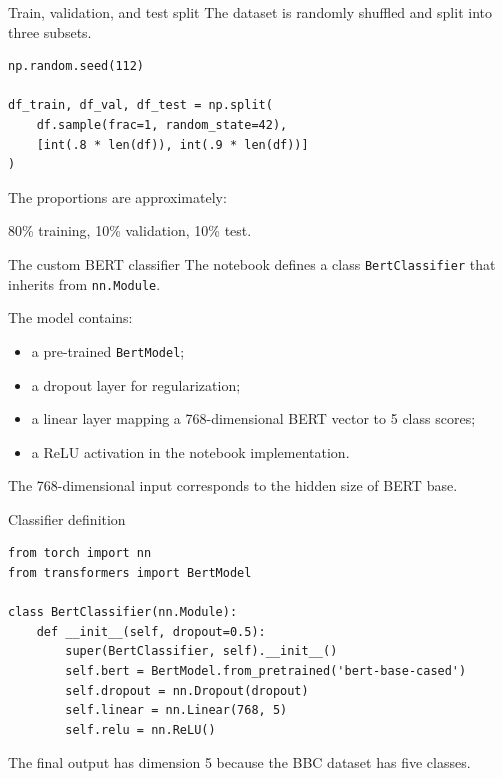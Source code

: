 \documentclass[aspectratio=169]{beamer}
\begin{document}
\begin{frame}[fragile]{Train, validation, and test split}
The dataset is randomly shuffled and split into three subsets.

\begin{lstlisting}[style=pythonstyle]
np.random.seed(112)

df_train, df_val, df_test = np.split(
    df.sample(frac=1, random_state=42),
    [int(.8 * len(df)), int(.9 * len(df))]
)
\end{lstlisting}

\vspace{0.2cm}

The proportions are approximately:
\begin{center}
80\% training, 10\% validation, 10\% test.
\end{center}
\end{frame}

\begin{frame}{The custom BERT classifier}
The notebook defines a class \texttt{BertClassifier} that inherits from \texttt{nn.Module}.

\vspace{0.2cm}

The model contains:
\begin{itemize}
    \item a pre-trained \texttt{BertModel};
    \item a dropout layer for regularization;
    \item a linear layer mapping a 768-dimensional BERT vector to 5 class scores;
    \item a ReLU activation in the notebook implementation.
\end{itemize}

\vspace{0.2cm}

The 768-dimensional input corresponds to the hidden size of BERT base.
\end{frame}

\begin{frame}[fragile]{Classifier definition}
\begin{lstlisting}[style=pythonstyle]
from torch import nn
from transformers import BertModel

class BertClassifier(nn.Module):
    def __init__(self, dropout=0.5):
        super(BertClassifier, self).__init__()
        self.bert = BertModel.from_pretrained('bert-base-cased')
        self.dropout = nn.Dropout(dropout)
        self.linear = nn.Linear(768, 5)
        self.relu = nn.ReLU()
\end{lstlisting}

\vspace{0.2cm}

The final output has dimension 5 because the BBC dataset has five classes.
\end{frame}
\end{document}
